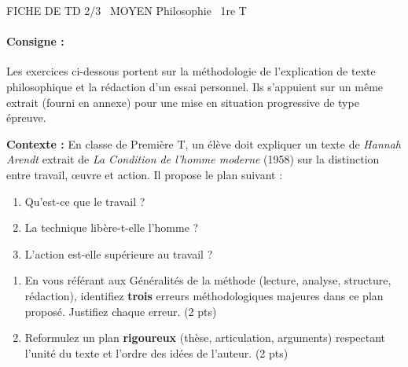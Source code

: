 \documentclass[11pt]{article}
\begin{document}
\begin{tcolorbox}[enhanced,colback=popink,colframe=popink,arc=10pt,boxrule=0pt,left=12pt,right=12pt,top=9pt,bottom=9pt]
{\color{white}\popxbold\small FICHE DE TD 2/3 \textbullet\ MOYEN \hfill Philosophie \textbullet\ 1re T\par}
\end{tcolorbox}
\vspace{4pt}

\paragraph{Consigne :} Les exercices ci-dessous portent sur la méthodologie de l'explication de texte philosophique et la rédaction d'un essai personnel. Ils s'appuient sur un même extrait (fourni en annexe) pour une mise en situation progressive de type épreuve.

\begin{exercice}
\textbf{Contexte :} En classe de Première T, un élève doit expliquer un texte de \textit{Hannah Arendt} extrait de \textit{La Condition de l'homme moderne} (1958) sur la distinction entre travail, œuvre et action. Il propose le plan suivant : 
\begin{enumerate}
    \item Qu'est-ce que le travail ?
    \item La technique libère-t-elle l'homme ?
    \item L'action est-elle supérieure au travail ?
\end{enumerate}
\begin{enumerate}
    \item En vous référant aux \og Généralités \fg{} de la méthode (lecture, analyse, structure, rédaction), identifiez \textbf{trois} erreurs méthodologiques majeures dans ce plan proposé. Justifiez chaque erreur. \hfill (2 pts)
    \item Reformulez un plan \textbf{rigoureux} (thèse, articulation, arguments) respectant l'unité du texte et l'ordre des idées de l'auteur. \hfill (2 pts)
\end{enumerate}
\end{exercice}
\end{document}
